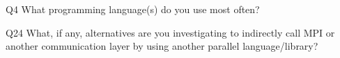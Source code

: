 \begin{description}%
\item{Q4} What programming language(s) do you use most often?%
\item{Q24} What, if any, alternatives are you investigating to indirectly call MPI or another communication layer by using another parallel language/library?%
\end{description}%
